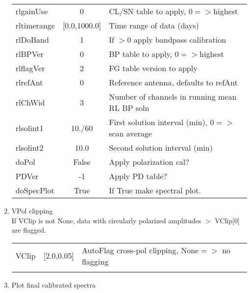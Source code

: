 \documentclass[11pt]{article}
\begin{document}
\begin{enumerate}
\begin{center}
\begin{tabular}{|l|c|l|}
rlgainUse   & 0            & CL/SN table to apply, $0=>$highest\\
rltimerange & [0.0,1000.0] & Time range of data (days)\\
rlDoBand    & 1            & If $> 0$ apply bandpass calibration \\
rlBPVer     & 0            & BP table to apply, $0=>$highest\\
rlflagVer   & 2            & FG table version to apply \\
rlrefAnt    & 0            & Reference antenna, defaults to refAnt\\
rlChWid     & 3            & Number of channels in running mean RL BP soln\\
rlsolint1   & 10./60       & First solution interval (min), $0=>$ scan average\\
rlsolint2   & 10.0         & Second solution interval (min)\\
doPol       & False        & Apply polarization cal?\\
PDVer       & -1           & Apply PD table?\\
doSpecPlot  & True         & If True make spectral plot.\\
\hline
\end{tabular}
\end{center}
%
\item VPol clipping\\
If VClip is not None, data with circularly polarized amplitudes $>$
VClip[0] are flagged. 
\begin{center}
\begin{tabular}{|l|c|l|}
\hline
VClip  & [2.0,0.05] & AutoFlag cross-pol clipping, None$=>$ no flagging  \\
  &  &  \\
\hline
\end{tabular}
\end{center}
%
\item Plot final calibrated spectra\\

\end{enumerate}
\end{document}
